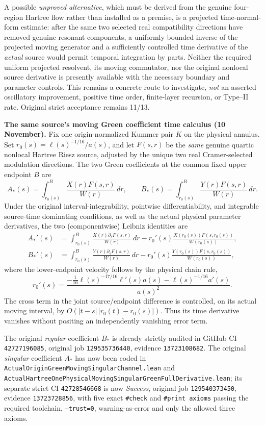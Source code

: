 \documentclass[11pt]{amsart}
\begin{document}
A possible \emph{unproved alternative}, which must be derived from
the genuine four-region Hartree flow rather than installed as a premise,
is a projected time-normal-form estimate: after the same two selected
real compatibility directions have removed genuine resonant components,
a uniformly bounded inverse of the projected moving generator and a
sufficiently controlled time derivative of the \emph{actual} source
would permit temporal integration by parts.  Neither the required
uniform projected resolvent, its moving commutator, nor the original
nonlocal source derivative is presently available with the necessary
boundary and parameter controls.  This remains a concrete route to
investigate, \emph{not} an asserted oscillatory improvement, positive
time order, finite-layer recursion, or Type--II rate. Original strict
acceptance remains 11/13.


\medskip
\noindent\textbf{The same source's moving Green coefficient time calculus (10 November).}
Fix one origin-normalized Kummer pair \(K\) on the physical annulus.
Set \(r_0(s)=\ell(s)^{-1/16}/a(s)\), and let
\(F(s,r)\) be the \emph{same} genuine quartic nonlocal Hartree Riesz
source, adjusted by the unique two real Cramer-selected modulation
directions. The two Green coefficients at the common fixed upper
endpoint \(B\) are
\[
 A_*(s)=\int_{r_0(s)}^{B}
    \frac{X(r)F(s,r)}{W(r)}\,dr,\qquad
 B_*(s)=\int_{r_0(s)}^{B}
    \frac{Y(r)F(s,r)}{W(r)}\,dr.
\]
Under the original interval-integrability, pointwise differentiability,
and integrable source-time dominating conditions, as well as the actual
physical parameter derivatives, the two (componentwise) Leibniz
identities are
\[
\begin{aligned}
 A_*'(s)
 &=\int_{r_0(s)}^B
     \frac{X(r)\partial_sF(s,r)}{W(r)}\,dr
    -r_0'(s)\frac{X(r_0(s))F(s,r_0(s))}{W(r_0(s))},\\
 B_*'(s)
 &=\int_{r_0(s)}^B
     \frac{Y(r)\partial_sF(s,r)}{W(r)}\,dr
    -r_0'(s)\frac{Y(r_0(s))F(s,r_0(s))}{W(r_0(s))},
\end{aligned}
\]
where the lower-endpoint velocity follows by the physical chain rule,
\[
 r_0'(s)=
 \frac{-\frac1{16}\ell(s)^{-17/16}\ell'(s)a(s)
           -\ell(s)^{-1/16}a'(s)}{a(s)^2}.
\]
The cross term in the joint source/endpoint difference is controlled,
on its actual moving interval, by
\(O(|t-s|\,|r_0(t)-r_0(s)|)\). Thus its time derivative vanishes
without positing an independently vanishing error term.

The original \emph{regular} coefficient \(B_*\) is already
strictly audited in GitHub CI \texttt{42727196085}, original job
\texttt{129535736440}, evidence \texttt{13723108682}. The
original \emph{singular} coefficient \(A_*\) has now been coded in
\texttt{ActualOriginGreenMovingSingularChannel.lean} and
\texttt{ActualHartreeOnePhysicalMovingSingularGreenFullDerivative.lean};
its separate strict CI \texttt{42728546668} is now
\emph{Success}, original job \texttt{129540373450}, evidence
\texttt{13723728856}, with five exact \texttt{\#check} and
\texttt{\#print axioms} passing the required toolchain,
\texttt{--trust=0}, warning-as-error and only the allowed three axioms.
\end{document}
